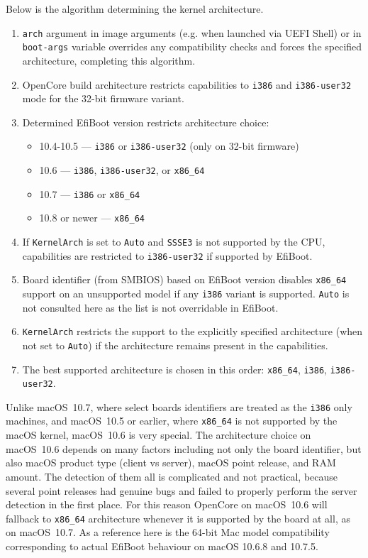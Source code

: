 \documentclass[]{article}
\providecommand{\tightlist}{%
  \setlength{\itemsep}{0pt}\setlength{\parskip}{0pt}}
\begin{document}
\begin{enumerate}
  Below is the algorithm determining the kernel architecture.

  \begin{enumerate}
    \tightlist
    \item \texttt{arch} argument in image arguments (e.g. when launched
    via UEFI Shell) or in \texttt{boot-args} variable overrides any compatibility
    checks and forces the specified architecture, completing this algorithm.
    \item OpenCore build architecture restricts capabilities to \texttt{i386}
      and \texttt{i386-user32} mode for the 32-bit firmware variant.
    \item Determined EfiBoot version restricts architecture choice:
      \begin{itemize}
      \item 10.4-10.5 --- \texttt{i386} or \texttt{i386-user32} (only on 32-bit firmware)
      \item 10.6 --- \texttt{i386}, \texttt{i386-user32}, or \texttt{x86\_64}
      \item 10.7 --- \texttt{i386} or \texttt{x86\_64}
      \item 10.8 or newer --- \texttt{x86\_64}
      \end{itemize}
    \item If \texttt{KernelArch} is set to \texttt{Auto} and \texttt{SSSE3}
      is not supported by the CPU, capabilities are restricted to \texttt{i386-user32}
      if supported by EfiBoot.
    \item Board identifier (from SMBIOS) based on EfiBoot version
      disables \texttt{x86\_64} support on an unsupported model
      if any \texttt{i386} variant is supported. \texttt{Auto}
      is not consulted here as the list is not overridable in EfiBoot.
    \item \texttt{KernelArch} restricts the support to the explicitly
      specified architecture (when not set to \texttt{Auto}) if
      the architecture remains present in the capabilities.
    \item The best supported architecture is chosen in this order:
      \texttt{x86\_64}, \texttt{i386}, \texttt{i386-user32}.
  \end{enumerate}

  Unlike macOS~10.7, where select boards identifiers are treated as the \texttt{i386}
  only machines, and macOS~10.5 or earlier, where \texttt{x86\_64} is not supported
  by the macOS kernel, macOS~10.6 is very special. The architecture choice on macOS~10.6
  depends on many factors including not only the board identifier, but also macOS
  product type (client vs server), macOS point release, and RAM amount. The detection
  of them all is complicated and not practical, because several point releases had genuine
  bugs and failed to properly perform the server detection in the first place.
  For this reason OpenCore on macOS~10.6 will fallback to \texttt{x86\_64}
  architecture whenever it is supported by the board at all, as on macOS~10.7.
  As a reference here is the 64-bit Mac model compatibility corresponding to actual
  EfiBoot behaviour on macOS 10.6.8 and 10.7.5.


\end{enumerate}
\end{document}
